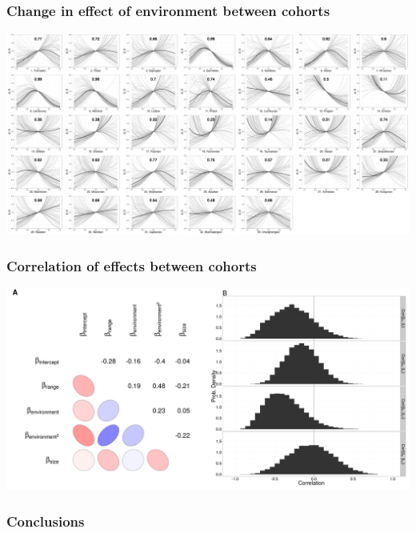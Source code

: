 \documentclass{beamer}
\begin{document}
\begin{frame}
  \frametitle{Change in effect of environment between cohorts}
  
  \includegraphics[width = \textwidth,height = \textheight,keepaspectratio = true]{figure/cohort_quads}
\end{frame}


\begin{frame}
  \frametitle{Correlation of effects between cohorts}
  
  \begin{center}
    \includegraphics[width = \textwidth,height = 0.9\textheight,keepaspectratio = true]{figure/cor_mixed}
  \end{center}
\end{frame}


\begin{frame}
  \frametitle{Conclusions}
\end{frame}
\end{document}
